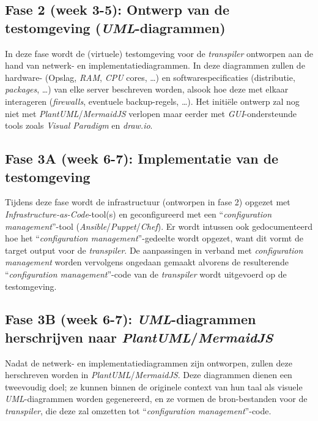 \subsection{Fase 2 (week 3-5): Ontwerp van de testomgeving (\emph{UML}-diagrammen)}%
\label{subsec:voorstel_hardware_softwarespecs_testomgeving}

In deze fase wordt de (virtuele) testomgeving voor de \emph{transpiler} ontworpen aan de hand van netwerk- en implementatiediagrammen. In deze diagrammen zullen de hardware- (Opslag, \emph{RAM}, \emph{CPU} cores, \ldots) en softwarespecificaties (distributie, \emph{packages}, \ldots) van elke server beschreven worden, alsook hoe deze met elkaar interageren (\emph{firewalls}, eventuele backup-regels, \ldots). Het initiële ontwerp zal nog niet met \emph{PlantUML}/\emph{MermaidJS} verlopen maar eerder met \emph{GUI}-ondersteunde tools zoals \emph{Visual Paradigm} en \emph{draw.io}.

\subsection{Fase 3A (week 6-7): Implementatie van de testomgeving}%
\label{subsec:voorstel_implementatie_manuele_testomgeving}

Tijdens deze fase wordt de infrastructuur (ontworpen in fase 2) opgezet met \emph{Infrastructure-as-Code}-tool(s) en geconfigureerd met een ``\emph{configuration management}''-tool (\emph{Ansible}/\emph{Puppet}/\emph{Chef}). Er wordt intussen ook gedocumenteerd hoe het ``\emph{configuration management}''-gedeelte wordt opgezet, want dit vormt de target output voor de \emph{transpiler}. De aanpassingen in verband met \emph{configuration management} worden vervolgens ongedaan gemaakt alvorens de resulterende ``\emph{configuration management}''-code van de \emph{transpiler} wordt uitgevoerd op de testomgeving.

\subsection{Fase 3B (week 6-7): \emph{UML}-diagrammen herschrijven naar \emph{PlantUML}/\emph{MermaidJS}}%
\label{subsec:voorstel_uml_diagrammen_herscrijven}

Nadat de netwerk- en implementatiediagrammen zijn ontworpen, zullen deze herschreven worden in \emph{PlantUML}/\emph{MermaidJS}. Deze diagrammen dienen een tweevoudig doel; ze kunnen binnen de originele context van hun taal als visuele \emph{UML}-diagrammen worden gegenereerd, en ze vormen de bron-bestanden voor de \emph{transpiler}, die deze zal omzetten tot ``\emph{configuration management}''-code.


